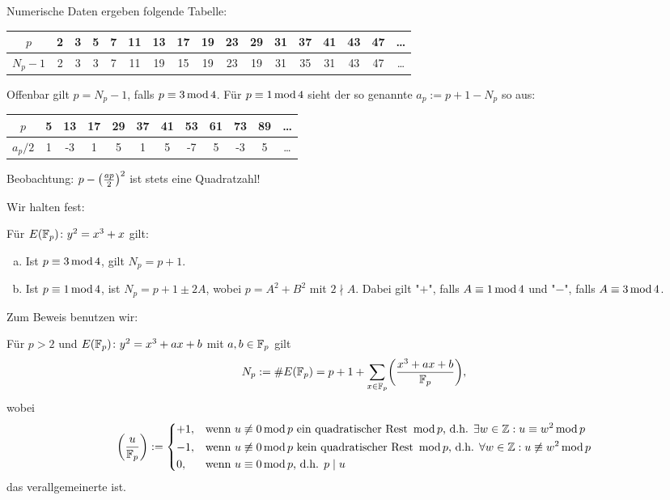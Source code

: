 \begin{defn}[Defekt]
	Numerische Daten ergeben folgende Tabelle:
	\begin{center}
		\begin{tabular}{c||c|c|c|c|c|c|c|c|c|c|c|c|c|c|c|c}
		$p$ & 2 & 3 & 5 & 7 & 11 & 13 & 17 & 19 & 23 & 29 & 31 & 37 & 41 & 43 & 47 & \dots \\ 
		\hline $N_p-1$ & 2 & 3 & 3 & 7 & 11 & 19 & 15 & 19 & 23 & 19 & 31 & 35 & 31 & 43 & 47 & \dots
		\end{tabular} 
	\end{center}
	Offenbar gilt $p = N_p-1$, falls $p \kon 3 \modu 4$.
	Für $p \kon 1 \modu 4$ sieht der so genannte  $a_p := p+1 - N_p$ so aus:
	\begin{center}
		\begin{tabular}{c||c|c|c|c|c|c|c|c|c|c|c}
		$p$ & 5 & 13 & 17 & 29 & 37 & 41 & 53 & 61 & 73 & 89 & \dots \\ 
		\hline $a_p / 2$ & 1 & -3 & 1 & 5 & 1 & 5 & -7 & 5 & -3 & 5 & \dots 
		\end{tabular} 
	\end{center}
	Beobachtung: $p-\enbrace*{\frac{ap}{2}}^2$ ist stets eine Quadratzahl!
\end{defn}

Wir halten fest:
\begin{satz}
\label{satz_17.4}
	Für $E(\FF_p)\colon y^2 = x^3+x$ gilt:
	\begin{enumerate}[(a)]
		\item Ist $p \kon 3 \modu 4$, gilt $N_p = p+1$.
		\item Ist $p \kon 1 \modu 4$, ist $N_p = p+1 \pm 2A$, wobei $p = A^2 + B^2$ mit $2 \nmid A$.
		Dabei gilt "$+$", falls $A \kon 1 \modu 4$ und "$-$", falls $A \kon 3 \modu 4$.
	\end{enumerate}
\end{satz}

Zum Beweis benutzen wir:
\begin{satz}
	Für $p > 2$ und $E(\FF_p) \colon y^2 = x^3 + ax + b$ mit $a,b \in \FF_p$ gilt
	\[
		N_p := \#E(\FF_p) = p+1+\sum_{x \in \FF_p} \leg{x^3+ax+b}{\FF_p},
	\]
	wobei
	\[
		\leg{u}{\FF_p} := \begin{dcases}
			+1, & \text{wenn } u \not\kon 0 \modu p \text{ ein quadratischer Rest } \modu p\text{, d.h. } \exists w \in \ZZ : u \kon w^2 \modu p \\
			-1, & \text{wenn } u \not\kon 0 \modu p \text{ kein quadratischer Rest } \modu p\text{, d.h. } \forall w \in \ZZ : u \not\kon w^2 \modu p \\
			0, & \text{wenn } u \kon 0 \modu p\text{, d.h. } p \mid u
		\end{dcases}
	\]
	das verallgemeinerte  ist.
\end{satz}

